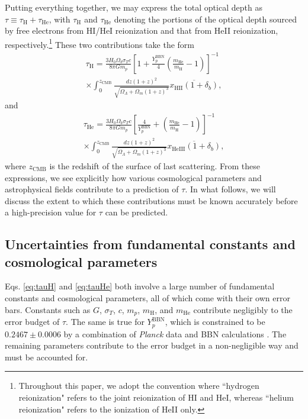\documentclass[twocolumn,aps,prd,nofootinbib,showpacs]{revtex4-1}
\begin{document}
Putting everything together, we may express the total optical depth as $\tau \equiv \tau_\textrm{H} + \tau_\textrm{He}$, with $\tau_\textrm{H}$ and $\tau_\textrm{He}$ denoting the portions of the optical depth sourced by free electrons from HI/HeI reionization and that from HeII reionization, respectively.\footnote{Throughout this paper, we adopt the convention where ``hydrogen reionization" refers to the joint reionization of HI and HeI, whereas ``helium reionization" refers to the ionization of HeII only.} These two contributions take the form
\begin{eqnarray}
\label{eq:tauH}
\tau_\textrm{H} = \frac{3 H_0 \Omega_b \sigma_Tc}{8 \pi G m_p} \left[ 1 + \frac{Y_p^\textrm{BBN}}{4}\left( \frac{m_\textrm{He}}{m_\textrm{H}} - 1\right)\right]^{-1} \nonumber \\
\times \int_0^{z_\textrm{CMB}} \frac{dz (1+z)^2}{\sqrt{\Omega_\Lambda + \Omega_m (1+z)^3}}  \overline{x_\textrm{HII} (1+\delta_b)},
\end{eqnarray} 
and
\begin{eqnarray}
\label{eq:tauHe}
\tau_\textrm{He} = \frac{3 H_0 \Omega_b \sigma_Tc}{8 \pi G m_p} \left[ \frac{4}{Y_p^\textrm{BBN}} + \left( \frac{m_\textrm{He}}{m_\textrm{H}} - 1\right)\right]^{-1} \nonumber \\
\times \int_0^{z_\textrm{CMB}} \frac{dz (1+z)^2}{\sqrt{\Omega_\Lambda + \Omega_m (1+z)^3}}  \overline{x_\textrm{HeIII} (1+\delta_b)},
\end{eqnarray}
where $z_\textrm{CMB}$ is the redshift of the surface of last scattering. From these expressions, we see explicitly how various cosmological parameters and astrophysical fields contribute to a prediction of $\tau$. In what follows, we will discuss the extent to which these contributions must be known accurately before a high-precision value for $\tau$ can be predicted.

\subsection{Uncertainties from fundamental constants and cosmological parameters}
\label{sec:CosmoParamUncertainties}
Eqs. \eqref{eq:tauH} and \eqref{eq:tauHe} both involve a large number of fundamental constants and cosmological parameters, all of which come with their own error bars. Constants such as $G$, $\sigma_T$, $c$, $m_p$, $m_\textrm{H}$, and $m_\textrm{He}$ contribute negligibly to the error budget of $\tau$. The same is true for $Y_p^\textrm{BBN}$, which is constrained to be $0.2467\pm0.0006$ by a combination of \emph{Planck} data and BBN calculations \cite{Planck2015parameters}. The remaining parameters contribute to the error budget in a non-negligible way and must be accounted for.
\end{document}
